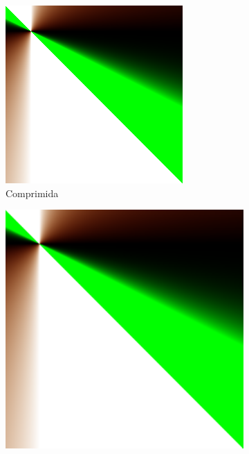 \documentclass{article}
\begin{document}
\begin{figure}[ht]
\begin{subfigure}{0.23\textwidth}
    \includegraphics[width=\textwidth]{polinomial/h-10/compressed.png}
    \caption{Comprimida}
  \end{subfigure}%
  \hfill
  \begin{subfigure}{0.23\textwidth}
    \centering
    \includegraphics[width=\textwidth]{polinomial/h-10/decompressed-bilinear.png}

\end{subfigure}
\end{figure}
\end{document}
